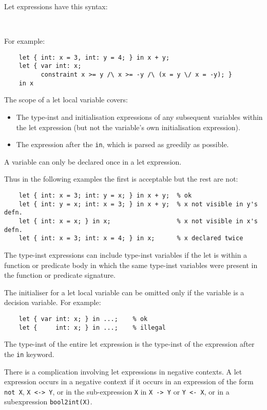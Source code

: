 \documentclass[10pt]{scrartcl}
\begin{document}
Let expressions have this syntax:
\begin{productions}
    \RuleLetExpr \\
    \RuleLetItem
\end{productions}
For example:
\begin{verbatim}
    let { int: x = 3, int: y = 4; } in x + y;
    let { var int: x; 
          constraint x >= y /\ x >= -y /\ (x = y \/ x = -y); } 
    in x 
\end{verbatim}
The scope of a let local variable covers:
\begin{itemize}
\item The type-inst and initialisation expressions of any subsequent variables
      within the let expression (but not the variable's own initialisation
      expression).
\item The expression after the \texttt{in}, which is parsed as greedily as
      possible.
\end{itemize}
A variable can only be declared once in a let expression.

Thus in the following examples the first is acceptable but the rest are not:
\begin{verbatim}
    let { int: x = 3; int: y = x; } in x + y;  % ok
    let { int: y = x; int: x = 3; } in x + y;  % x not visible in y's defn.
    let { int: x = x; } in x;                  % x not visible in x's defn.
    let { int: x = 3; int: x = 4; } in x;      % x declared twice
\end{verbatim}

The type-inst expressions can include type-inst variables if the let is
within a function or predicate body in which the same type-inst variables
were present in the function or predicate signature.

The initialiser for a let local variable can be omitted only if the variable
is a decision variable.  For example:
\begin{verbatim}
    let { var int: x; } in ...;    % ok
    let {     int: x; } in ...;    % illegal
\end{verbatim}

The type-inst of the entire let expression is the type-inst of the expression
after the \texttt{in} keyword.

There is a complication involving let expressions in negative contexts.  A
let expression occurs in a negative context if it occurs in an expression
of the form \texttt{not X}, \texttt{X <-> Y}, or in the sub-expression
\texttt{X} in \texttt{X -> Y} or \texttt{Y <- X}, or in a subexpression 
\texttt{bool2int(X)}.
\end{document}
